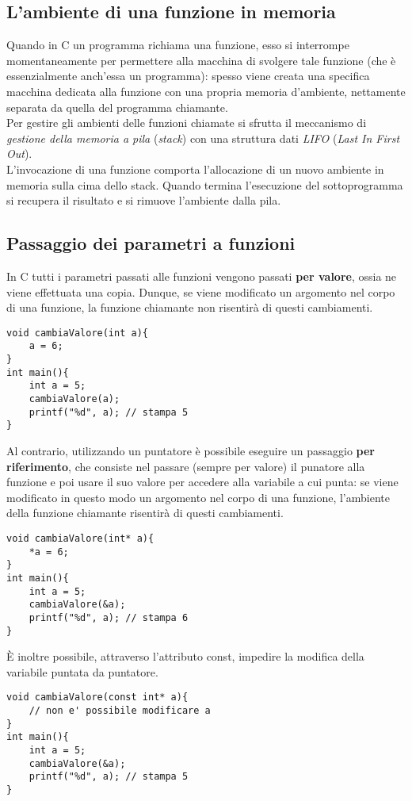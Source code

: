 \subsection{L'ambiente di una funzione in memoria}
Quando in C un programma richiama una funzione, esso si interrompe momentaneamente per permettere alla macchina di svolgere tale funzione (che è essenzialmente anch’essa un programma): spesso viene creata una specifica macchina dedicata alla funzione con una propria memoria d'ambiente, nettamente separata da quella del programma chiamante.\\
Per gestire gli ambienti delle funzioni chiamate si sfrutta il meccanismo di \textit{gestione della memoria a pila} (\textit{stack}) con una struttura dati \textit{LIFO} (\textit{Last In First Out}).\\ L’invocazione di una funzione comporta l’allocazione di un nuovo ambiente in memoria sulla cima dello stack. Quando termina l’esecuzione del sottoprogramma si recupera il risultato e si rimuove l'ambiente dalla pila.

\subsection{Passaggio dei parametri a funzioni}
In C tutti i parametri passati alle funzioni vengono passati \textbf{per valore}, ossia ne viene effettuata una copia. Dunque, se viene modificato un argomento nel corpo di una funzione, la funzione chiamante non risentirà di questi cambiamenti.
\begin{lstlisting}[title={Il passaggio per valore}]
void cambiaValore(int a){
    a = 6;
}
int main(){
    int a = 5;
    cambiaValore(a);
    printf("%d", a); // stampa 5
}
\end{lstlisting}
Al contrario, utilizzando un puntatore è possibile eseguire un passaggio \textbf{per riferimento}, che consiste nel passare (sempre per valore) il punatore alla funzione e poi usare il suo  valore per accedere alla variabile a cui punta: se viene modificato in questo modo un argomento nel corpo di una funzione, l'ambiente della funzione chiamante risentirà di questi cambiamenti.
\begin{lstlisting}[title={Il passaggio per riferimento}]
void cambiaValore(int* a){
    *a = 6;
}
int main(){
    int a = 5;
    cambiaValore(&a);
    printf("%d", a); // stampa 6
}
\end{lstlisting}

\`{E} inoltre possibile, attraverso l'attributo \colorbox{light-gray}{const}, impedire la modifica della variabile puntata da puntatore.
\begin{lstlisting}[title={Utilizzo dell'attributo const}]
void cambiaValore(const int* a){
    // non e' possibile modificare a
}
int main(){
    int a = 5;
    cambiaValore(&a);
    printf("%d", a); // stampa 5
}
\end{lstlisting}

